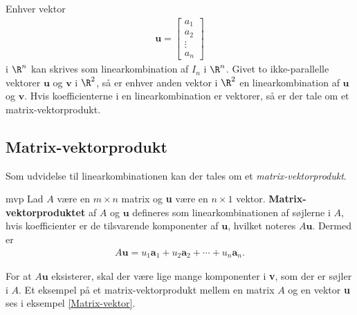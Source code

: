 %
%
Enhver vektor 
\begin{align*}
\textbf{u}=
\begin{bmatrix}
a_1 \\
a_2 \\
\vdots \\
a_n
\end{bmatrix}
\end{align*}
%
i $\R^n$ kan skrives som linearkombination af $I_n$ i $\R^n$. 
Givet to ikke-parallelle vektorer $\mathbf{u}$ og $\mathbf{v}$ i $\R^2$, så er enhver anden vektor i $\R^2$ en linearkombination af $\mathbf{u}$ og $\mathbf{v}$. 
Hvis koefficienterne i en linearkombination er vektorer, så er der tale om et matrix-vektorprodukt.
%
%
%
%
\subsection{Matrix-vektorprodukt}
%
Som udvidelse til linearkombinationen kan der tales om et \textit{matrix-vektorprodukt}.
%
%
\begin{defn}{}{mvp}
Lad $A$ være en $m \times n$ matrix og \textbf{u} være en $n \times 1$ vektor. 
\textbf{Matrix-vektorproduktet} af $A$ og $\textbf{u}$ defineres som linearkombinationen af søjlerne i $A$, hvis koefficienter er de tilsvarende komponenter af $\textbf{u}$, hvilket noteres $A\textbf{u}$. 
Dermed er
\begin{align*}
A\textbf{u} =u_1\textbf{a}_1 + u_2\textbf{a}_2 + \cdots + u_n\textbf{a}_n.
\end{align*}
\end{defn}
\noindent
For at $A\textbf{u}$ eksisterer, skal der være lige mange komponenter i \textbf{v}, som der er søjler i $A$. 
Et eksempel på et matrix-vektorprodukt mellem en matrix $A$ og en vektor \textbf{u} ses i eksempel \ref{Matrix-vektor}.
\\
%
